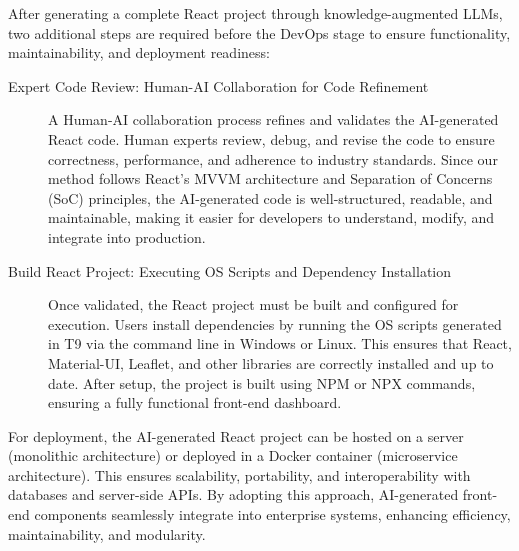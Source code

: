 After generating a complete React project through knowledge-augmented LLMs, two additional steps are required before the DevOps stage to ensure functionality, maintainability, and deployment readiness:

\begin{description}
\item[Expert Code Review: Human-AI Collaboration for Code Refinement]
A Human-AI collaboration process refines and validates the AI-generated React code. Human experts review, debug, and revise the code to ensure correctness, performance, and adherence to industry standards. Since our method follows React’s MVVM architecture and Separation of Concerns (SoC) principles, the AI-generated code is well-structured, readable, and maintainable, making it easier for developers to understand, modify, and integrate into production.

\item[Build React Project: Executing OS Scripts and Dependency Installation]
Once validated, the React project must be built and configured for execution. Users install dependencies by running the OS scripts generated in T9 via the command line in Windows or Linux. This ensures that React, Material-UI, Leaflet, and other libraries are correctly installed and up to date. After setup, the project is built using NPM or NPX commands, ensuring a fully functional front-end dashboard.
\end{description}
 
For deployment, the AI-generated React project can be hosted on a server (monolithic architecture) or deployed in a Docker container (microservice architecture). This ensures scalability, portability, and interoperability with databases and server-side APIs. By adopting this approach, AI-generated front-end components seamlessly integrate into enterprise systems, enhancing efficiency, maintainability, and modularity.

 



 